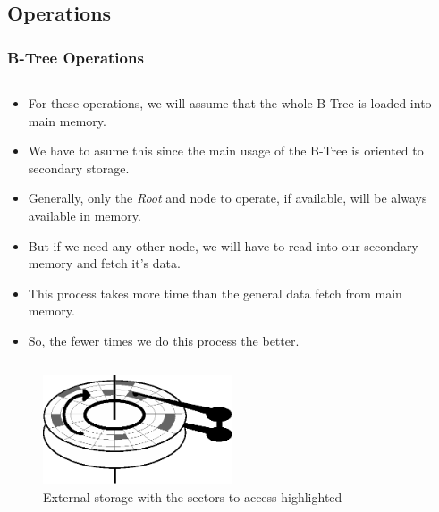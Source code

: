 \begin{frame}
    \subsection{Operations}
    \frametitle{B-Tree Operations}
    \begin{columns}
        \begin{column}{\textlecolumn}
            \begin{block}{}
                \begin{itemize}
                    \item For these operations, we will assume that the whole B-Tree is loaded into main memory.
                    \item We have to asume this since the main usage of the B-Tree is oriented to secondary storage.
                    \item Generally, only the \emph{Root} and node to operate, if available, will be always available in memory.
                    \item But if we need any other node, we will have to read into our secondary memory and fetch it's data.
                    \item This process takes more time than the general data fetch from main memory.
                    \item So, the fewer times we do this process the better.
                \end{itemize}
            \end{block}
        \end{column}
        \begin{column}{\textricolumn}
        \end{column}
    \end{columns}
    \begin{figure}[h!]
        \includegraphics[width=0.5\textwidth]{resources/made/external_storage_wblocks.eps}
        \caption{External storage with the sectors to access highlighted}
    \end{figure}
\end{frame}
